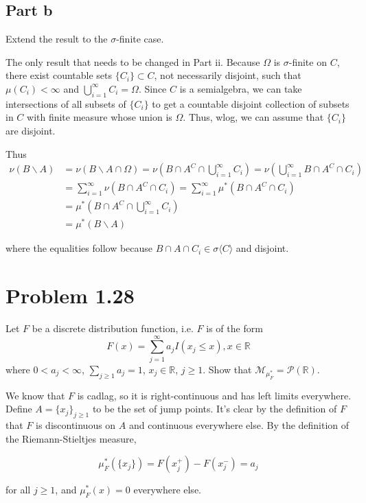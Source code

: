 \documentclass{article}
\newcommand{\R}{\mathbb{R}}
\newcommand{\M}{\mathcal{M}}
\begin{document}
\subsection*{Part b}

Extend the result to the $\sigma$-finite case.

The only result that needs to be changed in Part ii. Because $\Omega$ is $\sigma$-finite on $C$, there exist countable sets $\{C_i\} \subset C$, not necessarily disjoint, such that $\mu(C_i) < \infty$ and $\bigcup_{i=1}^\infty C_i = \Omega$. Since $C$ is a semialgebra, we can take intersections of all subsets of $\{C_i\}$ to get a countable disjoint collection of subsets in $C$ with finite measure whose union is $\Omega$. Thus, wlog, we can assume that $\{C_i\}$ are disjoint.

Thus
\begin{align*}
\nu(B \backslash A) &= \nu(B \backslash A \cap \Omega) = \nu\left(B \cap A^C \cap \bigcup_{i=1}^\infty C_i \right) 
= \nu\left( \bigcup_{i=1}^\infty B \cap A^C \cap C_i \right) \\
&= \sum_{i=1}^\infty \nu\left(B \cap A^C \cap C_i \right)
= \sum_{i=1}^\infty \mu^*\left(B \cap A^C \cap C_i \right) \\
&= \mu^*\left(B \cap A^C \cap \bigcup_{i=1}^\infty C_i \right) \\
&= \mu^*(B \backslash A)
\end{align*}

where the equalities follow because $B \cap A \cap C_i \in \sigma\langle C \rangle$ and disjoint.

\section*{Problem 1.28}

Let $F$ be a discrete distribution function, i.e. $F$ is of the form
\[
F(x) = \sum_{j=1}^\infty a_jI(x_j \leq x), x \in \R
\]
where $0 < a_j < \infty$, $\sum_{j \geq 1} a_j = 1$, $x_j \in \R$, $j \geq 1$. Show that $\M_{\mu_F^*} = \mathcal{P}(\R)$.

We know that $F$ is cadlag, so it is right-continuous and has left limits everywhere. Define $A = \{x_j\}_{j \geq 1}$ to be the set of jump points. It's clear by the definition of $F$ that $F$ is discontinuous on $A$ and continuous everywhere else. By the definition of the Riemann-Stieltjes measure,

\[
\mu_F^*(\{x_j\}) = F(x_j^+) - F(x_j^-) = a_j
\]

for all $j \geq 1$, and $\mu_F^*(x) = 0$ everywhere else.
\end{document}
